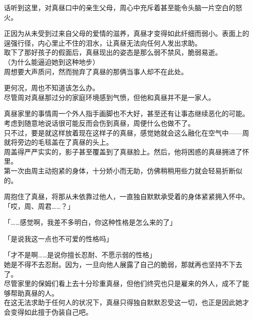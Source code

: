 话听到这里，对真昼口中的亲生父母，周心中充斥着甚至能令头脑一片空白的怒火。

正因为从未受到过来自父母的爱情的滋养，真昼才变得如此纤细而弱小。表面上的逞强行径，内心里止不住的泪水，让真昼无法向任何人发出求助。\\

取下了那好孩子的假面后，真昼现出的姿态是那么弱不禁风，脆弱易逝。\\

（为什么能逼迫她到这种地步）\\

周想要大声质问，然而抛弃了真昼的那俩当事人却不在此处。

更何况，周也不知道该怎么办。\\

尽管周对真昼那过分的家庭环境感到气愤，但他和真昼并不是一家人。

真昼家里的事情周一个外人指手画脚也不大好，甚至还有让事态继续恶化的可能。考虑到随意地说话很可能反而会伤到真昼，周便什么也做不了。\\

只不过，要是就这样放着现在这样子的真昼，感觉她就会这么融化在空气中——周就将旁边的毛毯盖在了真昼的头上。\\

周盖得严严实实的，影子甚至覆盖到了真昼脸上。然后，他将困惑的真昼拥进了怀里。\\

第一次由周主动抱紧的身体，十分娇小而无助，仿佛稍稍用些力就会轻易折断似的。

周抱住了真昼，将那从未依靠过他人，一直独自默默承受着的身体紧紧拥入怀中。\\

「哎，周、周君……？」

「……感觉啊，我差不多明白，你这种性格是怎么来的了」

「是说我这一点也不可爱的性格吗」

「才不是啊……是说你擅长忍耐、不愿示弱的性格」\\

她是不得不去忍耐。因为，一旦向他人展露了自己的脆弱，那就再也坚持不下去了。\\

尽管家里的保姆们看上去十分珍重真昼，但他们终究也只是雇来的外人，成不了能够帮助真昼的人。\\

在这无法求助于任何人的状况下，真昼只得独自默默忍受这一切，也正是因此她才会变得如此擅于伪装自己吧。\\

